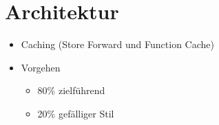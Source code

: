 \chapter{Architektur}
\label{cha:architektur}

\begin{itemize}
\item Caching (Store Forward und Function Cache)
\item Vorgehen
\begin{itemize}
\item 80\% zielführend
\item 20\% gefälliger Stil
\end{itemize}

\end{itemize}
